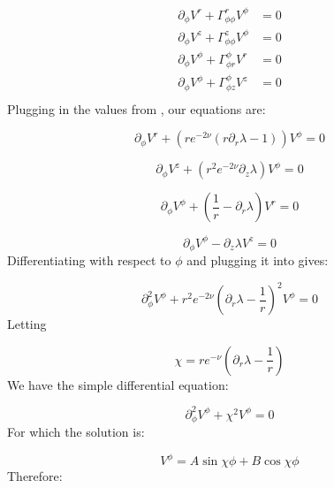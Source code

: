 \documentclass{article}
\begin{document}
\begin{equation}
\begin{aligned}
\partial_{\phi}V^{r}+\Gamma^{r}_{\phi\phi}V^{\phi}&=0\\
\partial_{\phi}V^{z}+\Gamma^{z}_{\phi\phi}V^{\phi}&=0\\
\partial_{\phi}V^{\phi}+\Gamma^{\phi}_{\phi r}V^{r}&=0\\
\partial_{\phi}V^{\phi}+\Gamma^{\phi}_{\phi z}V^{z}&=0\\
\end{aligned}
\end{equation}
Plugging in the values from , our equations are: 

\begin{equation}
\partial_{\phi}V^{r}+\left(re^{-2\nu}\left(r\partial_{r}\lambda-1\right)\right)V^{\phi}=0\label{eq:V-r-phi}
\end{equation}

\begin{equation}
\label{eq:V_z-V_phi}
\partial_{\phi}V^{z}+\left(r^{2}e^{-2\nu}\partial_{z}\lambda\right)V^{\phi}=0
\end{equation}

\begin{equation}
\partial_{\phi}V^{\phi}+\left(\frac{1}{r}-\partial_{r}\lambda\right)V^{r}=0\label{eq:V-phi-r}
\end{equation}

\begin{equation}
\partial_{\phi}V^{\phi}-\partial_{z}\lambda V^{z}=0\label{eq:V-phi-z}
\end{equation}
Differentiating  with respect to $\phi$ and plugging it into  gives:

\begin{equation}
\partial^{2}_{\phi}V^{\phi}+r^{2}e^{-2\nu}\left(\partial_r\lambda-\frac{1}{r}\right)^2V^{\phi}=0
\end{equation}
Letting 

\begin{equation}
\label{eq:def-chi}
\chi=re^{-\nu}(\partial_r\lambda-\frac{1}{r})
\end{equation}
We have the simple differential equation:

\begin{equation}
\partial^2_\phi V^\phi+\chi^2 V^\phi=0
\end{equation}
For which the solution is:

\begin{equation}
V^{\phi}=A\sin\chi\phi+B\cos\chi\phi
\end{equation}
Therefore:
\end{document}
